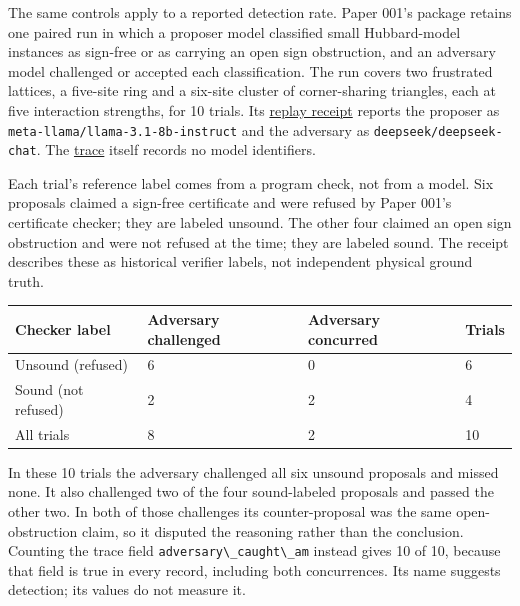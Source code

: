 \documentclass[
  11pt,
]{article}
\newcommand{\passthrough}[1]{#1}
\begin{document}
The same controls apply to a reported detection rate. Paper 001's
package retains one paired run in which a proposer model classified
small Hubbard-model instances as sign-free or as carrying an open sign
obstruction, and an adversary model challenged or accepted each
classification. The run covers two frustrated lattices, a five-site ring
and a six-site cluster of corner-sharing triangles, each at five
interaction strengths, for 10 trials. Its
\href{https://github.com/dbccpage/the_symbol_game/blob/52cb5457f6c485ba548cfd292f6012a941ed22cf/omega_engine_atlas/coda_atlas/omega_engine_symbol_game/001_pfp_discrete_cochain_retraction_and_toy_involutions/results/demo2_r7_adversarial_debate_receipt.json}{replay
receipt} reports the proposer as
\nolinkurl{meta-llama/llama-3.1-8b-instruct} and the adversary as
\passthrough{\lstinline!deepseek/deepseek-chat!}. The
\href{https://github.com/dbccpage/the_symbol_game/blob/52cb5457f6c485ba548cfd292f6012a941ed22cf/omega_engine_atlas/coda_atlas/omega_engine_symbol_game/001_pfp_discrete_cochain_retraction_and_toy_involutions/results/demo2_r7_adversarial_debate_1790210039.jsonl}{trace}
itself records no model identifiers.

Each trial's reference label comes from a program check, not from a
model. Six proposals claimed a sign-free certificate and were refused by
Paper 001's certificate checker; they are labeled unsound. The other
four claimed an open sign obstruction and were not refused at the time;
they are labeled sound. The receipt describes these as historical
verifier labels, not independent physical ground truth.

\begin{longtable}[]{@{}llll@{}}
\toprule\noalign{}
Checker label & Adversary challenged & Adversary concurred & Trials \\
\midrule\noalign{}
\endhead
\bottomrule\noalign{}
\endlastfoot
Unsound (refused) & 6 & 0 & 6 \\
Sound (not refused) & 2 & 2 & 4 \\
All trials & 8 & 2 & 10 \\
\end{longtable}

In these 10 trials the adversary challenged all six unsound proposals
and missed none. It also challenged two of the four sound-labeled
proposals and passed the other two. In both of those challenges its
counter-proposal was the same open-obstruction claim, so it disputed the
reasoning rather than the conclusion. Counting the trace field
\passthrough{\lstinline!adversary\_caught\_am!} instead gives 10 of 10,
because that field is true in every record, including both concurrences.
Its name suggests detection; its values do not measure it.
\end{document}
